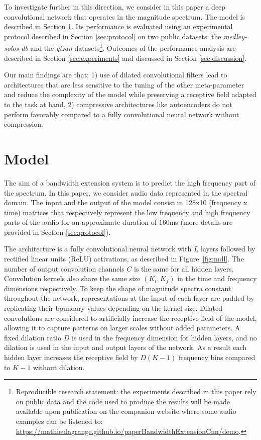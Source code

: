 \documentclass{article}
\begin{document}
To investigate further in this direction, we consider in this paper a deep convolutional network that operates in the magnitude spectrum. The model is described in Section \ref{sec:model}. Its performance is evaluated using an experimental protocol described in Section \ref{sec:protocol} on two public datasets: the \textit{medley-solos-db} and the \textit{gtzan} datasets\footnote{Reproducible research statement: the experiments described in this paper rely on public data and the code used to produce the results will be made available upon publication on the companion website where some audio examples can be listened to: \url{https://mathieulagrange.github.io/paperBandwidthExtensionCnn/demo}.}. Outcomes of the performance analysis are described in Section \ref{sec:experiments} and discussed in Section \ref{sec:discussion}. 

Our main findings are that: 1) use of dilated convolutional filters lead to architectures that are less sensitive to the tuning of the other meta-parameter and reduce the complexity of the model while preserving a receptive field adapted to the task at hand, 2) compressive architectures like autoencoders do not perform favorably compared to a fully convolutional neural network without compression.

\section{Model}
\label{sec:model}

The aim of a bandwidth extension system is to predict the high frequency part of the spectrum. In this paper, we consider audio data represented in the spectral domain. The input and the output of the model consist in 128x10 (frequency x time) matrices that respectively represent the low frequency and high frequency parts of the audio for an approximate duration of $160$ms (more details are provided in Section \ref{sec:protocol}).

The architecture is a fully convolutional neural network \cite{long2015fully} with $L$ layers followed by rectified linear units (ReLU) activations, as described in Figure~\ref{fig:mdl}. The number of output convolution channels $C$ is the same for all hidden layers. Convolution kernels also share the same size $(K_t, K_f)$ in the time and frequency dimensions respectively. To keep the shape of magnitude spectra constant throughout the network, representations at the input of each layer are padded by replicating their boundary values depending on the kernel size. Dilated convolutions \cite{yu2016multi, oord2016wavenet} are considered to artificially increase the receptive field of the model, allowing it to capture patterns on larger scales without added parameters. A fixed dilation ratio $D$ is used in the frequency dimension for hidden layers, and no dilation is used in the input and output layers of the network. As a result each hidden layer increases the receptive field by $D(K-1)$ frequency bins compared to $K-1$ without dilation.
\end{document}
